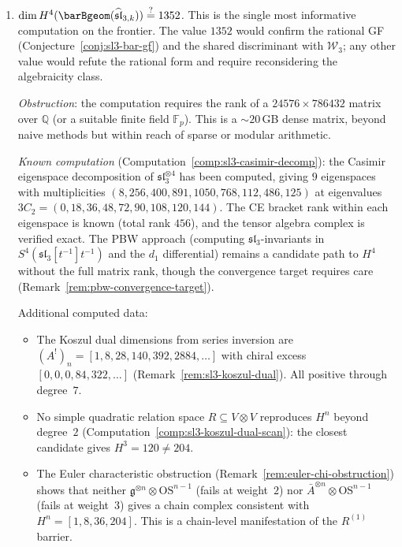\begin{enumerate}[label=\textbf{NF-\arabic*.}, leftmargin=3em]
\item\label{nf:sl3-h4}
\emph{$\dim H^4(\barBgeom(\widehat{\mathfrak{sl}}_{3,k})) \stackrel{?}{=} 1352$.}
This is the single most informative computation on the frontier. The value $1352$ would confirm the rational GF (Conjecture~\ref{conj:sl3-bar-gf}) and the shared discriminant with $\mathcal{W}_3$; any other value would refute the rational form and require reconsidering the algebraicity class.

\emph{Obstruction}: the computation requires the rank of a $24576 \times 786432$ matrix over $\mathbb{Q}$ (or a suitable finite field $\mathbb{F}_p$). This is a $\sim 20$\,GB dense matrix, beyond naive methods but within reach of sparse or modular arithmetic.

\emph{Known computation} (Computation~\ref{comp:sl3-casimir-decomp}):
the Casimir eigenspace decomposition of $\mathfrak{sl}_3^{\otimes 4}$ has been
computed, giving $9$ eigenspaces with multiplicities
$(8, 256, 400, 891, 1050, 768, 112, 486, 125)$
at eigenvalues $3C_2 = (0, 18, 36, 48, 72, 90, 108, 120, 144)$.
The CE bracket rank within each eigenspace is known
(total rank $456$), and the tensor algebra complex is verified exact.
The PBW approach (computing $\mathfrak{sl}_3$-invariants in
$S^4(\mathfrak{sl}_3[t^{-1}]t^{-1})$ and the $d_1$ differential)
remains a candidate path to $H^4$ without the full matrix rank,
though the convergence target requires care
(Remark~\ref{rem:pbw-convergence-target}).

Additional computed data:
\begin{itemize}
\item
The Koszul dual dimensions from series inversion are
$(A^!)_n = [1, 8, 28, 140, 392, 2884, \allowbreak\ldots]$
with chiral excess $[0, 0, 0, 84, 322, \ldots]$
(Remark~\ref{rem:sl3-koszul-dual}).
All positive through degree~$7$.
\item
No simple quadratic relation space $R \subseteq V \otimes V$
reproduces $H^n$ beyond degree~$2$
(Computation~\ref{comp:sl3-koszul-dual-scan}): the closest
candidate gives $H^3 = 120 \neq 204$.
\item
The Euler characteristic obstruction
(Remark~\ref{rem:euler-chi-obstruction}) shows that neither
$\mathfrak{g}^{\otimes n} \otimes \mathrm{OS}^{n-1}$ (fails at
weight~$2$) nor $\bar{A}^{\otimes n} \otimes \mathrm{OS}^{n-1}$
(fails at weight~$3$) gives a chain complex
consistent with $H^n = [1, 8, 36, 204]$. This is a chain-level
manifestation of the $R^{(1)}$ barrier.
\end{itemize}


\end{enumerate}
